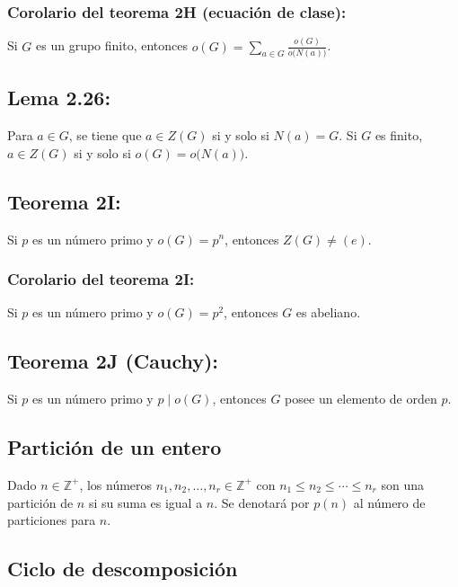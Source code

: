\documentclass{article}
\begin{document}
\subsubsection*{\color{red} Corolario del teorema 2H (ecuación de clase):}

Si $G$ es un grupo finito, entonces $o(G)=\displaystyle\sum_{a\in G}\frac{o(G)}{o\big(N(a)\big)}$.

\subsection*{\color{blue} Lema 2.26:}

Para $a\in G$, se tiene que $a\in Z(G)$ si y solo si $N(a)=G$. Si $G$ es finito, $a\in Z(G)$ si y solo si $o(G)=o\big(N(a)\big)$.

\subsection*{\color{red} Teorema 2I:}

Si $p$ es un número primo y $o(G)=p^n$, entonces $Z(G)\neq(e)$.

\subsubsection*{\color{red} Corolario del teorema 2I:}

Si $p$ es un número primo y $o(G)=p^2$, entonces $G$ es abeliano.

\subsection*{\color{red} Teorema 2J (Cauchy):}

Si $p$ es un número primo y $p\mid o(G)$, entonces $G$ posee un elemento de orden $p$.

\subsection*{\color{violet} Partición de un entero}

Dado $n\in\mathbb{Z}^+$, los números $n_1,n_2,\ldots,n_r\in\mathbb{Z}^+$ con $n_1\leq n_2\leq\cdots\leq n_r$ son una partición de $n$ si su suma es igual a $n$. Se denotará por $p(n)$ al número de particiones para $n$.

\subsection*{\color{violet} Ciclo de descomposición}
\end{document}
